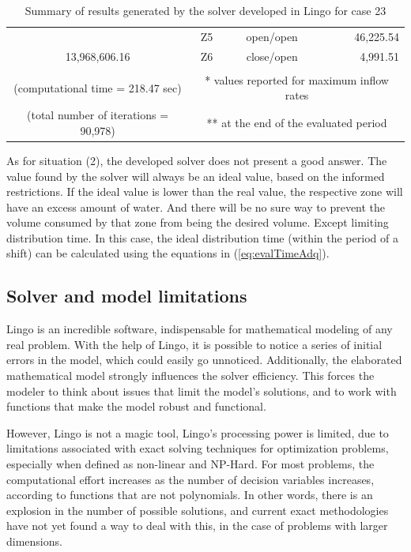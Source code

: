 \documentclass{singlecol}
\theoremstyle{TH}{
\newtheorem{lemma}{Lemma}
\newtheorem{theorem}[lemma]{Theorem}
\newtheorem{corrolary}[lemma]{Corrolary}
\newtheorem{conjecture}[lemma]{Conjecture}
\newtheorem{proposition}[lemma]{Proposition}
\newtheorem{claim}[lemma]{Claim}
\newtheorem{stheorem}[lemma]{Wrong Theorem}
\newtheorem{algorithm}{Algorithm}
}
\theoremstyle{THrm}{
\newtheorem{definition}{Definition}[section]
\newtheorem{question}{Question}[section]
\newtheorem{remark}{Remark}
\newtheorem{scheme}{Scheme}
}
\theoremstyle{THhit}{
\newtheorem{case}{Case}[section]
}
\begin{document}
\begin{table}[t]
\begin{center}
\begin{small}
\begin{tabular}{ c r r r r r }
	   &             &             						    & \multicolumn{1}{c}{Z5}     & \multicolumn{1}{c}{open/open} &   46,225.54  \\
	   \multicolumn{3}{c}{13,968,606.16}              		& \multicolumn{1}{c}{Z6}     & \multicolumn{1}{c}{close/open} &    4,991.51  \\
	   \\
	   \multicolumn{3}{c}{(computational time = 218.47 sec)} & \multicolumn{3}{c}{* values reported for maximum inflow rates} \\
	   \multicolumn{3}{c}{(total number of iterations = 90,978)} & \multicolumn{3}{c}{** at the end of the evaluated period} 

	\end{tabular}
\caption{Summary of results generated by the solver developed in Lingo for case 23}
\label{tab:lingoEvaluationsCase23}
\end{small}
\end{center}
\end{table}

As for situation (2), the developed solver does not present a good answer. The value found by the solver will always be an ideal value, based on the informed restrictions. If the ideal value is lower than the real value, the respective zone will have an excess amount of water. And there will be no sure way to prevent the volume consumed by that zone from being the desired volume. Except limiting distribution time. In this case, the ideal distribution time (within the period of a shift) can be calculated using the equations in (\ref{eq:evalTimeAdq}). 

\subsection{Solver and model limitations}
\label{sec:limitations}

Lingo is an incredible software, indispensable for mathematical modeling of any real problem. With the help of Lingo, it is possible to notice a series of initial errors in the model, which could easily go unnoticed. Additionally, the elaborated mathematical model strongly influences the solver efficiency. This forces the modeler to think about issues that limit the model's solutions, and to work with functions that make the model robust and functional.

However, Lingo is not a magic tool, Lingo's processing power is limited, due to limitations associated with exact solving techniques for optimization problems, especially when defined as non-linear and NP-Hard. For most problems, the computational effort increases as the number of decision variables increases, according to functions that are not polynomials. In other words, there is an explosion in the number of possible solutions, and current exact methodologies have not yet found a way to deal with this, in the case of problems with larger dimensions. 
\end{document}
